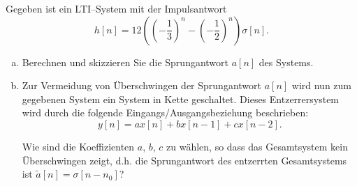 \begin{uebsp}
\begin{Exercise}
Gegeben ist ein LTI–System mit der Impulsantwort
\[h[n]=12\left(\left(-\frac{1}{3}\right)^n-\left(-\frac{1}{2}\right)^n\right)\sigma[n].\]
\begin{enumerate}[a)]
    \item Berechnen und skizzieren Sie die Sprungantwort $a[n]$ des Systems.
    \item Zur Vermeidung von Überschwingen der Sprungantwort $a[n]$ wird nun zum gegebenen System ein System in Kette geschaltet. 
        Dieses Entzerrersystem wird durch die folgende Eingangs/Ausgangsbeziehung beschrieben:
        \[y[n]=ax[n]+bx[n-1]+cx[n-2].\]
        \begin{center}
            \end{center}
        Wie sind die Koeffizienten $a$, $b$, $c$ zu wählen, so dass das
        Gesamtsystem kein Überschwingen zeigt, d.h. die Sprungantwort des
        entzerrten Gesamtsystems ist $\tilde a[n]=\sigma[n-n_0]$?


\end{enumerate}
\end{Exercise}
\end{uebsp}
